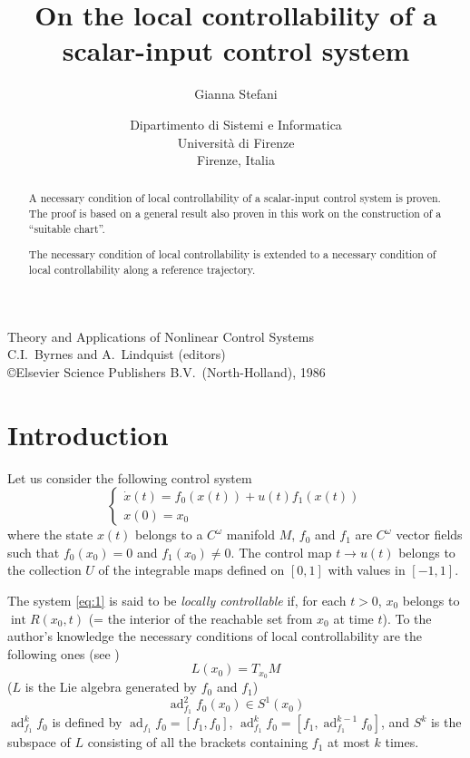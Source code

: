 \documentclass{article}
\title{On the local controllability of a \\ scalar-input control system}
\author{Gianna Stefani}
\date{
	Dipartimento di Sistemi e Informatica\\
	Università di Firenze\\
	Firenze, Italia
}
\newcommand{\ad}{\operatorname{ad}}
\newcommand{\interior}{\operatorname{int}}
\begin{document}
	
\noindent
Theory and Applications of Nonlinear Control Systems \\
C.I.\ Byrnes and A.\ Lindquist (editors) \\
\copyright Elsevier Science Publishers B.V.\ (North-Holland), 1986

{\let\newpage\relax\maketitle}

\maketitle

\renewcommand*\abstractname{}

\begin{abstract}
	A necessary condition of local controllability of a scalar-input control system is proven. 
	The proof is based on a general result also proven in this work on the construction of a ``suitable chart''.
	
	The necessary condition of local controllability is extended to a necessary condition of local controllability along a reference trajectory.
\end{abstract}

\section{Introduction}

Let us consider the following control system
\begin{equation} \label{eq:1}
	\begin{cases}
		\dot{x}(t) = f_0(x(t)) + u(t) f_1(x(t)) \\
		x(0) = x_0
	\end{cases}
\end{equation}
where the state $x(t)$ belongs to a $C^\omega$ manifold $M$, $f_0$ and $f_1$ are $C^\omega$ vector fields such that $f_0(x_0) = 0$ and $f_1(x_0) \neq 0$.
The control map $t \to u(t)$ belongs to the collection $U$ of the integrable maps defined on $[0,1]$ with values in $[-1,1]$.

The system \eqref{eq:1} is said to be \emph{locally controllable} if, for each $t>0$, $x_0$ belongs to $\interior R(x_0,t)$ (= the interior of the reachable set from $x_0$ at time $t$). To the author's knowledge the necessary conditions of local controllability are the following ones (see \cite{2,3})
\begin{equation} \label{eq:2}
	L(x_0) = T_{x_0} M
\end{equation}
($L$ is the Lie algebra generated by $f_0$ and $f_1$)
\begin{equation} \label{eq:3}
	\ad^2_{f_1} f_0 (x_0) \in S^1(x_0)
\end{equation}
$\ad^k_{f_1} f_0$ is defined by $\ad_{f_1} f_0 = [f_1,f_0]$, $\ad^k_{f_1} f_0 = [f_1, \ad^{k-1}_{f_1} f_0]$, and $S^k$ is the subspace of $L$ consisting of all the brackets containing $f_1$ at most $k$ times.
\end{document}
